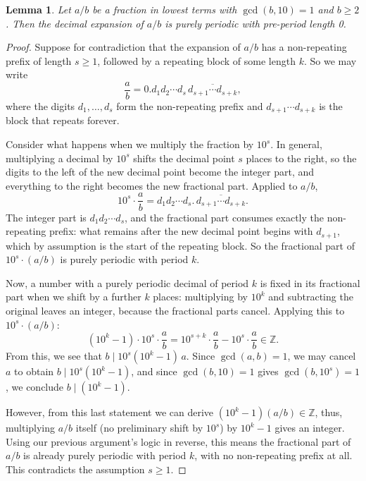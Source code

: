 \documentclass[12pt]{amsart}
\newtheorem{lemma}[theorem]{Lemma}
\theoremstyle{definition}
\theoremstyle{remark}
\newcommand{\Z}{\mathbb{Z}}
\begin{document}
\begin{lemma}\label{lem:purely-periodic}
Let $a/b$ be a fraction in lowest terms with $\gcd(b, 10) = 1$ and 
$b \ge 2$. Then the decimal expansion of $a/b$ is purely periodic with pre-period length 0.
\end{lemma}

\begin{proof}
Suppose for contradiction that the expansion of $a/b$ has a 
non-repeating prefix of length $s \ge 1$, followed by a repeating block 
of some length $k$. So we may write
\[
  \frac{a}{b} = 0.d_1 d_2 \cdots d_s \,\overline{d_{s+1} \cdots d_{s+k}},
\]
where the digits $d_1, \ldots, d_s$ form the non-repeating prefix and 
$d_{s+1} \cdots d_{s+k}$ is the block that repeats forever.

Consider what happens when we multiply the fraction by $10^s$. In general, 
multiplying a decimal by $10^s$ shifts the decimal point $s$ places to 
the right, so the digits to the left of the new decimal point become the 
integer part, and everything to the right becomes the new fractional 
part. Applied to $a/b$,
\[
  10^s \cdot \frac{a}{b} 
  = d_1 d_2 \cdots d_s . \,\overline{d_{s+1} \cdots d_{s+k}}.
\]
The integer part is $d_1 d_2 \cdots d_s$, and the fractional part 
consumes exactly the non-repeating prefix: what remains after the new 
decimal point begins with $d_{s+1}$, which by assumption is the start 
of the repeating block. So the fractional part of $10^s \cdot (a/b)$ is 
purely periodic with period $k$. 

Now, a number with a purely periodic decimal of period $k$ is fixed in 
its fractional part when we shift by a further $k$ places: multiplying 
by $10^k$ and subtracting the original leaves an integer, because the 
fractional parts cancel. Applying this to $10^s \cdot (a/b)$:
\[
  (10^k - 1) \cdot 10^s \cdot \frac{a}{b} 
  = 10^{s+k} \cdot \frac{a}{b} - 10^s \cdot \frac{a}{b} \in \Z.
\]
From this, we see that $b \mid 10^s(10^k - 1)\,a$. Since 
$\gcd(a, b) = 1$, we may cancel $a$ to obtain $b \mid 10^s(10^k - 1)$, 
and since $\gcd(b, 10) = 1$ gives $\gcd(b, 10^s) = 1$, we conclude 
$b \mid (10^k - 1)$.

However, from this last statement we can derive $(10^k - 1)(a/b) \in \Z$, thus, multiplying $a/b$ itself (no preliminary shift by $10^s$) by 
$10^k - 1$ gives an integer. Using our previous argument's logic in 
reverse, this means the fractional part of $a/b$ is already purely 
periodic with period $k$, with no non-repeating prefix at all. This 
contradicts the assumption $s \ge 1$.
\end{proof}
\end{document}
